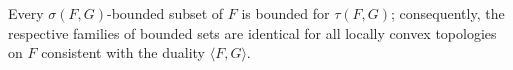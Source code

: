Every $\sigma(F, G)$-bounded subset of $F$ is bounded for $\tau(F, G)$; consequently, the respective families of bounded sets are identical for all locally convex topologies on $F$ consistent with the duality $\langle F, G \rangle$.
